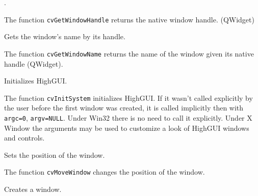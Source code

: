 \begin{description}
.
\end{description}

The function \texttt{cvGetWindowHandle} returns the native window handle. (QWidget)

Gets the window's name by its handle.


\begin{description}
\end{description}

The function \texttt{cvGetWindowName} returns the name of the window given its native handle (QWidget).

Initializes HighGUI.


\begin{description}
\end{description}

The function \texttt{cvInitSystem} initializes HighGUI. If it wasn't
called explicitly by the user before the first window was created, it is
called implicitly then with \texttt{argc=0}, \texttt{argv=NULL}. Under
Win32 there is no need to call it explicitly. Under X Window the arguments
may be used to customize a look of HighGUI windows and controls.


Sets the position of the window.


\begin{description}
\end{description}

The function \texttt{cvMoveWindow} changes the position of the window.

Creates a window.


